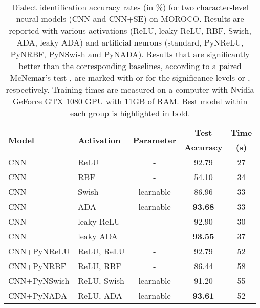 \documentclass[pdflatex,sn-mathphys]{sn-jnl}
\theoremstyle{thmstyleone}
\theoremstyle{thmstyletwo}\newtheorem{example}{Example}\newtheorem{remark}{Remark}
\theoremstyle{thmstylethree}\newtheorem{definition}{Definition}\DeclareMathOperator{\sinc}{sinc}
\begin{document}
\begin{table}[t] 
\setlength\tabcolsep{2.5pt}
\caption{Dialect identification accuracy rates (in \%) for two character-level neural models (CNN and CNN+SE) on MOROCO. Results are reported with various activations (ReLU, leaky ReLU, RBF, Swish, ADA, leaky ADA) and artificial neurons (standard, PyNReLU, PyNRBF, PyNSwish and PyNADA). Results that are significantly better than the corresponding baselines, according to a paired McNemar's test \citep{Dietterich-NC-1998}, are marked with  or  for the significance levels  or , respectively. Training times are measured on a computer with Nvidia GeForce GTX 1080 GPU with 11GB of RAM. Best model within each group is highlighted in bold.}\label{tab_MOROCO}
\small{
\begin{center}
\begin{tabular}{llccc}
\toprule
\multirow{2}{*}{\bf Model}                           & \multirow{2}{*}{\bf Activation}            & \multirow{2}{*}{\bf Parameter}             & {\bf Test }         & {\bf Time }  \\ 
                          &          &             &    {\bf Accuracy}     & {\bf (s)}\\
\midrule
CNN~\cite{Butnaru-ACL-2019}     & ReLU		            & -	                    & 92.79                 & 27\\
CNN                             & RBF	                & -                     & 54.10                 & 34\\
CNN                             & Swish	                & learnable     & 86.96                 & 33\\
CNN                             & ADA 		            & learnable    & {\bf 93.68}       & 33\\
\midrule
CNN                             & leaky ReLU	        & -             	    & 92.90                 & 30\\
CNN                             & leaky ADA 	        & 	        & {\bf 93.55}       & 37\\
\midrule
CNN+PyNReLU                     & ReLU, ReLU 	        & -	                    & 92.79                 & 52\\
CNN+PyNRBF                      & ReLU, RBF 	        & -	                    & 86.44                 & 58\\
CNN+PyNSwish                    & ReLU, Swish 	        & learnable	    & 91.20                 & 55\\
CNN+PyNADA                      & ReLU, ADA 	        & learnable	& {\bf 93.61}       & 52\\

\end{tabular}
\end{center}}
\end{table}
\end{document}
